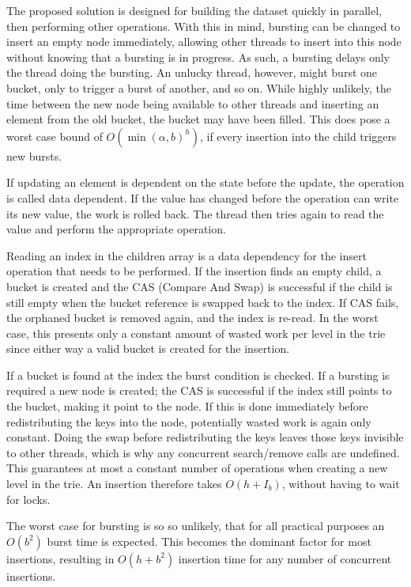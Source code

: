 The proposed solution is designed for building the dataset quickly in
parallel, then performing other operations. With this in mind, bursting can be
changed to insert an empty node immediately, allowing other threads to insert
into this node without knowing that a bursting is in progress. As such, a
bursting delays only the thread doing the bursting. An unlucky thread, however,
might burst one bucket, only to trigger a burst of another, and so on. While
highly unlikely, the time between the new node being available to other threads
and inserting an element from the old bucket, the bucket may have been filled.
This does pose a worst case bound of $O(\min(\alpha, b)^h)$, if every insertion
into the child triggers new bursts.

If updating an element is dependent on the state before the update, the operation
is called data dependent. If the value has changed before the operation can write
its new value, the work is rolled back. The thread then tries again to read the
value and perform the appropriate operation.

Reading an index in the children array is a data dependency for the insert
operation that needs to be performed. If the insertion finds an empty child,
a bucket is created and the CAS (Compare And Swap) is successful if
the child is still empty when the bucket reference is swapped back to the
index. If CAS fails, the orphaned bucket is removed again, and the index is
re-read. In the worst case, this presents only a constant amount of wasted work
per level in the trie since either way a valid bucket is created for the
insertion.

If a bucket is found at the index the burst condition is checked. If a bursting
is required a new node is created; the CAS is successful if the index
still points to the bucket, making it point to the node. If this is done
immediately before redistributing the keys into the node, potentially wasted
work is again only constant. Doing the swap before redistributing the
keys leaves those keys invisible to other threads, which is why any concurrent
search/remove calls are undefined. This guarantees at most a constant
number of operations when creating a new level in the trie. An insertion
therefore takes $O(h+I_b)$, without having to wait for locks.

The worst case for bursting is so so unlikely, that for all practical purposes
an $O(b^2)$ burst time is expected. This becomes the dominant factor for most
insertions, resulting in $O(h+b^2)$ insertion time for any number of concurrent
insertions.

